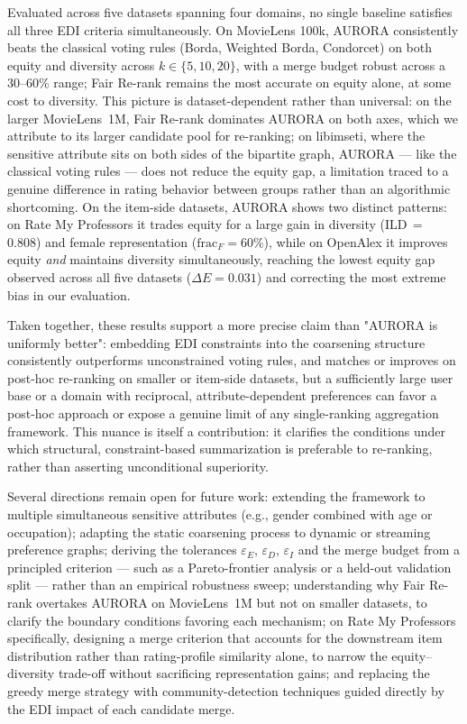 \documentclass[runningheads]{llncs}
\begin{document}
Evaluated across five datasets spanning four domains, no single baseline
satisfies all three EDI criteria simultaneously. On MovieLens 100k, AURORA
consistently beats the classical voting rules (Borda, Weighted Borda, Condorcet)
on both equity and diversity across $k \in \{5,10,20\}$, with a merge budget
robust across a 30--60\% range; Fair Re-rank remains the most accurate on equity
alone, at some cost to diversity. This picture is dataset-dependent rather than
universal: on the larger MovieLens~1M, Fair Re-rank dominates AURORA on both
axes, which we attribute to its larger candidate pool for re-ranking; on
libimseti, where the sensitive attribute sits on both sides of the bipartite
graph, AURORA --- like the classical voting rules --- does not reduce the equity gap,
a limitation traced to a genuine difference in rating behavior between groups
rather than an algorithmic shortcoming. On the item-side datasets, AURORA shows
two distinct patterns: on Rate My Professors it trades equity for a large gain
in diversity (ILD\,$=$\,0.808) and female representation ($\mathrm{frac}_F=60\%$),
while on OpenAlex it improves equity \emph{and} maintains diversity
simultaneously, reaching the lowest equity gap observed across all five datasets
($\Delta E = 0.031$) and correcting the most extreme bias in our evaluation.

Taken together, these results support a more precise claim than "AURORA is
uniformly better": embedding EDI constraints into the coarsening structure
consistently outperforms unconstrained voting rules, and matches or improves
on post-hoc re-ranking on smaller or item-side datasets, but a sufficiently
large user base or a domain with reciprocal, attribute-dependent preferences
can favor a post-hoc approach or expose a genuine limit of any single-ranking
aggregation framework. This nuance is itself a contribution: it clarifies the
conditions under which structural, constraint-based summarization is
preferable to re-ranking, rather than asserting unconditional superiority.

Several directions remain open for future work: extending the framework to
multiple simultaneous sensitive attributes (e.g., gender combined with age or
occupation); adapting the static coarsening process to dynamic or streaming
preference graphs; deriving the tolerances $\varepsilon_E$, $\varepsilon_D$,
$\varepsilon_I$ and the merge budget from a principled criterion --- such as a
Pareto-frontier analysis or a held-out validation split --- rather than an
empirical robustness sweep; understanding why Fair Re-rank overtakes AURORA on
MovieLens~1M but not on smaller datasets, to clarify the boundary conditions
favoring each mechanism; on Rate My Professors specifically, designing a merge
criterion that accounts for the downstream item distribution rather than
rating-profile similarity alone, to narrow the equity--diversity trade-off
without sacrificing representation gains; and replacing the greedy merge
strategy with community-detection techniques guided directly by the EDI impact
of each candidate merge.

%


\end{document}
